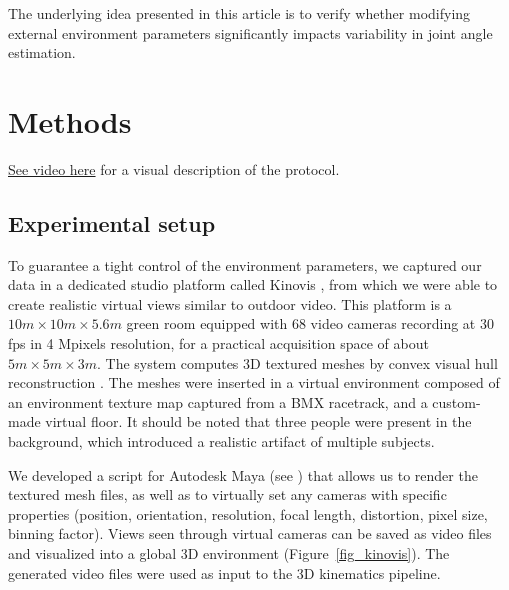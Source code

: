 The underlying idea presented in this article is to verify whether modifying external environment parameters significantly impacts variability in joint angle estimation.


\section{Methods}

\href{https://github.com/davidpagnon/These_David_Pagnon/blob/main/Thesis/Chap4/Figures/Vid_Protocol.mp4?raw=true}{See video here} for a visual description of the protocol.

\subsection{Experimental setup}

To guarantee a tight control of the environment parameters, we captured our data in a dedicated studio platform called Kinovis \cite{Tsiminaki2014}, from which we were able to create realistic virtual views similar to outdoor video. This platform is a \(10 m \times 10 m \times 5.6 m\) green room equipped with 68 video cameras recording at 30 fps in 4 Mpixels resolution, for a practical acquisition space of about \(5 m  \times 5 m  \times 3 m\). The system computes 3D textured meshes by convex visual hull reconstruction \cite{Laurentini1994}. The meshes were inserted in a virtual environment composed of an environment texture map captured from a BMX racetrack, and a custom-made virtual floor. It should be noted that three people were present in the background, which introduced a realistic artifact of multiple subjects.

We developed a script for Autodesk Maya \cite{Maya1998} (see ) that allows us to render the textured mesh files, as well as to virtually set any cameras with specific properties (position, orientation, resolution, focal length, distortion, pixel size, binning factor). Views seen through virtual cameras can be saved as video files and visualized into a global 3D environment (Figure~\ref{fig_kinovis}). The generated video files were used as input to the 3D kinematics pipeline.

